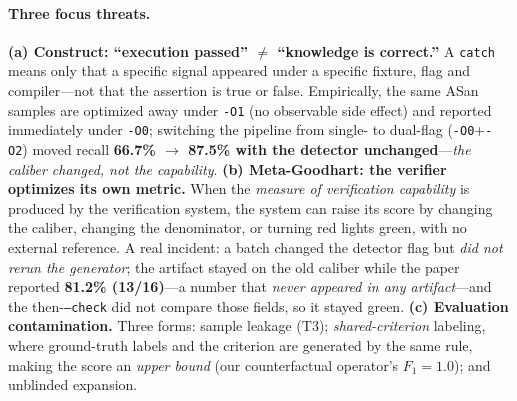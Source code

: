 \documentclass{article}
\begin{document}
\paragraph{Three focus threats.}
\textbf{(a) Construct: ``execution passed'' $\neq$ ``knowledge is correct.''} A \texttt{catch}
means only that a specific signal appeared under a specific fixture, flag and compiler---not that
the assertion is true or false. Empirically, the same ASan samples are optimized away under
\texttt{-O1} (no observable side effect) and reported immediately under \texttt{-O0}; switching the
pipeline from single- to dual-flag (\texttt{-O0}+\texttt{-O2}) moved recall \textbf{66.7\% $\to$
87.5\% with the detector unchanged}---\emph{the caliber changed, not the capability}.
\textbf{(b) Meta-Goodhart: the verifier optimizes its own metric.} When the \emph{measure of
verification capability} is produced by the verification system, the system can raise its score by
changing the caliber, changing the denominator, or turning red lights green, with no external
reference. A real incident: a batch changed the detector flag but \emph{did not rerun the
generator}; the artifact stayed on the old caliber while the paper reported \textbf{81.2\%
(13/16)}---a number that \emph{never appeared in any artifact}---and the then-\texttt{--check} did
not compare those fields, so it stayed green. \textbf{(c) Evaluation contamination.} Three forms:
sample leakage (T3); \emph{shared-criterion} labeling, where ground-truth labels and the criterion
are generated by the same rule, making the score an \emph{upper bound} (our counterfactual
operator's $F_1{=}1.0$); and unblinded expansion.

\end{document}
